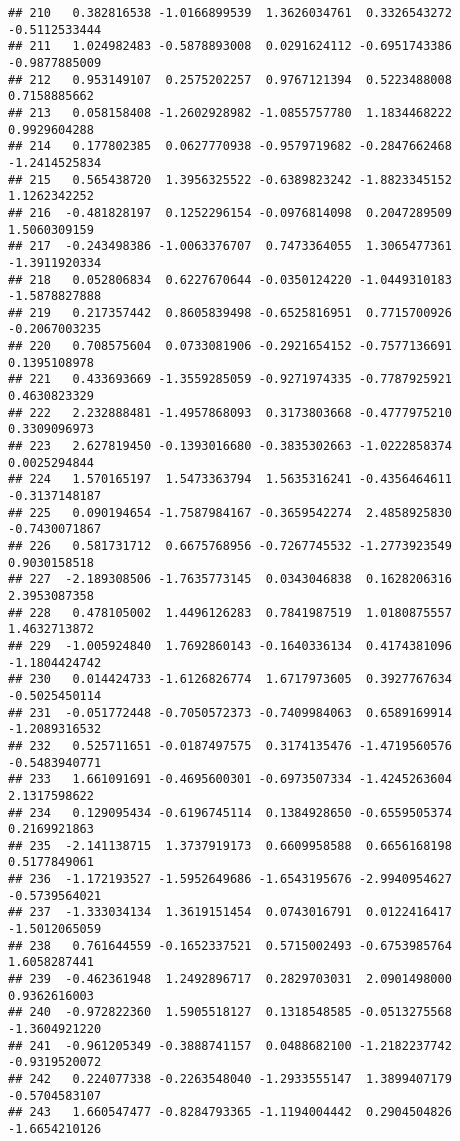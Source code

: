 \documentclass[
]{article}
\begin{document}
\begin{verbatim}
## 210   0.382816538 -1.0166899539  1.3626034761  0.3326543272 -0.5112533444
## 211   1.024982483 -0.5878893008  0.0291624112 -0.6951743386 -0.9877885009
## 212   0.953149107  0.2575202257  0.9767121394  0.5223488008  0.7158885662
## 213   0.058158408 -1.2602928982 -1.0855757780  1.1834468222  0.9929604288
## 214   0.177802385  0.0627770938 -0.9579719682 -0.2847662468 -1.2414525834
## 215   0.565438720  1.3956325522 -0.6389823242 -1.8823345152  1.1262342252
## 216  -0.481828197  0.1252296154 -0.0976814098  0.2047289509  1.5060309159
## 217  -0.243498386 -1.0063376707  0.7473364055  1.3065477361 -1.3911920334
## 218   0.052806834  0.6227670644 -0.0350124220 -1.0449310183 -1.5878827888
## 219   0.217357442  0.8605839498 -0.6525816951  0.7715700926 -0.2067003235
## 220   0.708575604  0.0733081906 -0.2921654152 -0.7577136691  0.1395108978
## 221   0.433693669 -1.3559285059 -0.9271974335 -0.7787925921  0.4630823329
## 222   2.232888481 -1.4957868093  0.3173803668 -0.4777975210  0.3309096973
## 223   2.627819450 -0.1393016680 -0.3835302663 -1.0222858374  0.0025294844
## 224   1.570165197  1.5473363794  1.5635316241 -0.4356464611 -0.3137148187
## 225   0.090194654 -1.7587984167 -0.3659542274  2.4858925830 -0.7430071867
## 226   0.581731712  0.6675768956 -0.7267745532 -1.2773923549  0.9030158518
## 227  -2.189308506 -1.7635773145  0.0343046838  0.1628206316  2.3953087358
## 228   0.478105002  1.4496126283  0.7841987519  1.0180875557  1.4632713872
## 229  -1.005924840  1.7692860143 -0.1640336134  0.4174381096 -1.1804424742
## 230   0.014424733 -1.6126826774  1.6717973605  0.3927767634 -0.5025450114
## 231  -0.051772448 -0.7050572373 -0.7409984063  0.6589169914 -1.2089316532
## 232   0.525711651 -0.0187497575  0.3174135476 -1.4719560576 -0.5483940771
## 233   1.661091691 -0.4695600301 -0.6973507334 -1.4245263604  2.1317598622
## 234   0.129095434 -0.6196745114  0.1384928650 -0.6559505374  0.2169921863
## 235  -2.141138715  1.3737919173  0.6609958588  0.6656168198  0.5177849061
## 236  -1.172193527 -1.5952649686 -1.6543195676 -2.9940954627 -0.5739564021
## 237  -1.333034134  1.3619151454  0.0743016791  0.0122416417 -1.5012065059
## 238   0.761644559 -0.1652337521  0.5715002493 -0.6753985764  1.6058287441
## 239  -0.462361948  1.2492896717  0.2829703031  2.0901498000  0.9362616003
## 240  -0.972822360  1.5905518127  0.1318548585 -0.0513275568 -1.3604921220
## 241  -0.961205349 -0.3888741157  0.0488682100 -1.2182237742 -0.9319520072
## 242   0.224077338 -0.2263548040 -1.2933555147  1.3899407179 -0.5704583107
## 243   1.660547477 -0.8284793365 -1.1194004442  0.2904504826 -1.6654210126

\end{verbatim}
\end{document}
